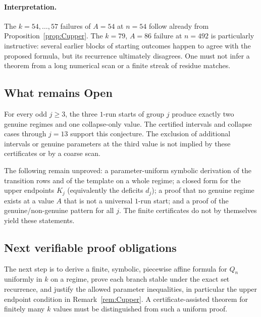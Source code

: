 \paragraph{Interpretation.} The $k=54,\ldots,57$ failures of $A=54$ at $n=54$ follow already from Proposition~\ref{prop:Cupper}. The $k=79$, $A=86$ failure at $n=492$ is particularly instructive: several earlier blocks of starting outcomes happen to agree with the proposed formula, but its recurrence ultimately disagrees. One must not infer a theorem from a long numerical scan or a finite streak of residue matches.

\subsection{What remains Open}
\begin{conjecture}\label{conj:Chierarchy}
For every odd $j\ge3$, the three $1$-run starts of group $j$ produce exactly two genuine regimes and one collapse-only value. The certified intervals and collapse cases through $j=13$ support this conjecture. The exclusion of additional intervals or genuine parameters at the third value is not implied by these certificates or by a coarse scan.
\end{conjecture}
\statusopen\quad The following remain unproved: a parameter-uniform symbolic derivation of the transition rows and of the template on a whole regime; a closed form for the upper endpoints $K_j$ (equivalently the deficits $d_j$); a proof that no genuine regime exists at a value $A$ that is not a universal $1$-run start; and a proof of the genuine/non-genuine pattern for all $j$. The finite certificates do not by themselves yield these statements.

\subsection{Next verifiable proof obligations}
The next step is to derive a finite, symbolic, piecewise affine formula for $Q_n$ uniformly in $k$ on a regime, prove each branch stable under the exact set recurrence, and justify the allowed parameter inequalities, in particular the upper endpoint condition in Remark~\ref{rem:Cupper}. A certificate-assisted theorem for finitely many $k$ values must be distinguished from such a uniform proof.\par
